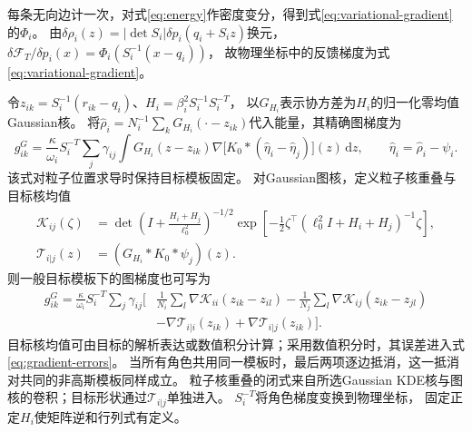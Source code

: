 \documentclass[UTF8,a4paper,11pt,fontset=none]{ctexart}
\begin{document}
每条无向边计一次，对式\eqref{eq:energy}作密度变分，得到式\eqref{eq:variational-gradient}的$\Phi_i$。
由$\delta\rho_i(z)=|\det S_i|\delta p_i(q_i+S_i z)$换元，
$\delta\mathcal F_T/\delta p_i(x)=\Phi_i(S_i^{-1}(x-q_i))$，
故物理坐标中的反馈梯度为式\eqref{eq:variational-gradient}。

令$z_{ik}=S_i^{-1}(r_{ik}-q_i)$、$H_i=\beta_i^2S_i^{-1}S_i^{-T}$，
以$G_{H_i}$表示协方差为$H_i$的归一化零均值Gaussian核。
将$\widehat\rho_i=N_i^{-1}\sum_kG_{H_i}(\cdot-z_{ik})$代入能量，其精确图梯度为
\begin{equation}
g^G_{ik}=\frac{\kappa}{\omega_i}S_i^{-T}\sum_j\gamma_{ij}
\int G_{H_i}(z-z_{ik})\nabla\big[K_0*(\widehat\eta_i-\widehat\eta_j)\big](z)\,\mathrm dz,
\qquad \widehat\eta_i=\widehat\rho_i-\psi_i .
\label{eq:graph-gradient-general}
\end{equation}
该式对粒子位置求导时保持目标模板固定。
对Gaussian图核，定义粒子核重叠与目标核均值
\begin{align}
\mathcal K_{ij}(\zeta)&=
\det\!\left(I+\frac{H_i+H_j}{\ell_0^2}\right)^{-1/2}
\exp\!\left[-\frac12\zeta^\top(\ell_0^2I+H_i+H_j)^{-1}\zeta\right],
\label{eq:kernel-overlap-general}\\
\mathcal T_{i|j}(z)&=(G_{H_i}*K_0*\psi_j)(z).
\nonumber
\end{align}
则一般目标模板下的图梯度也可写为
\begin{equation}
\begin{split}
g^G_{ik}=\frac{\kappa}{\omega_i}S_i^{-T}\sum_j\gamma_{ij}\Big[
&\frac1{N_i}\sum_l\nabla\mathcal K_{ii}(z_{ik}-z_{il})
-\frac1{N_j}\sum_l\nabla\mathcal K_{ij}(z_{ik}-z_{jl})\\
&-\nabla\mathcal T_{i|i}(z_{ik})+\nabla\mathcal T_{i|j}(z_{ik})\Big].
\end{split}
\label{eq:graph-target-correction}
\end{equation}
目标核均值可由目标的解析表达或数值积分计算；采用数值积分时，其误差进入式\eqref{eq:gradient-errors}。
当所有角色共用同一模板时，最后两项逐边抵消，这一抵消对共同的非高斯模板同样成立。
粒子核重叠的闭式来自所选Gaussian KDE核与图核的卷积；目标形状通过$\mathcal T_{i|j}$单独进入。
$S_i^{-T}$将角色梯度变换到物理坐标，
固定正定$H_i$使矩阵逆和行列式有定义。
\end{document}
